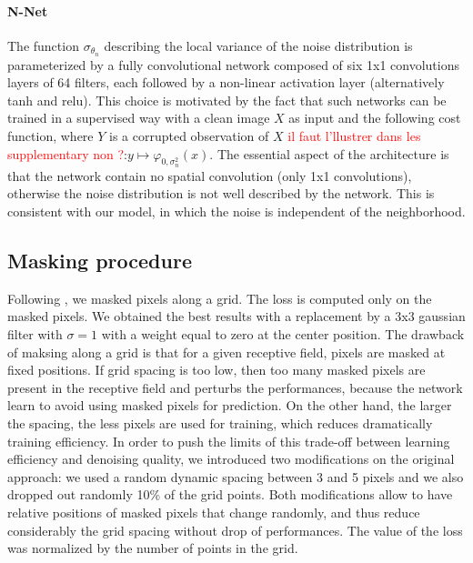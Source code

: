 \documentclass{article}
\begin{document}

\paragraph{N-Net}
The function $\sigma_{\theta_n}$ describing the local variance of the noise distribution is parameterized by a fully convolutional network composed of six 1x1 convolutions layers of 64 filters, each followed by a non-linear activation layer (alternatively tanh and relu).
This choice is motivated by the fact that such networks can be trained in a supervised way with a clean image $X$ as input and the following cost function, where $Y$ is a corrupted observation of $X$ \textcolor{red}{il faut l'llustrer dans les supplementary non ?}:$y\mapsto\varphi_{0,\sigma_n^2}(x)$.
The essential aspect of the architecture is that the network contain no spatial convolution (only 1x1 convolutions), otherwise the noise distribution is not well described by the network. This is consistent with our model, in which the noise is independent of the neighborhood.

\subsection{Masking procedure}
Following \cite{batson2019noise2self}, we masked pixels along a grid. The loss is computed only on the masked pixels.
We obtained the best results with a replacement by a 3x3 gaussian filter with $\sigma=1$ with a weight equal to zero at the center position.
The drawback of maksing along a grid is that for a given receptive field, pixels are masked at fixed positions. If grid spacing is too low, then too many masked pixels are present in the receptive field and perturbs the performances, because the network learn to avoid using masked pixels for prediction. On the other hand, the larger the spacing, the less pixels are used for training, which reduces dramatically training efficiency.
In order to push the limits of this trade-off between learning efficiency and denoising quality, we introduced two modifications on the original approach: we used a random dynamic spacing between 3 and 5 pixels and we also dropped out randomly 10\% of the grid points. Both modifications allow to have relative positions of masked pixels that change randomly, and thus reduce considerably the grid spacing without drop of performances. The value of the loss was normalized by the number of points in the grid.
\end{document}
